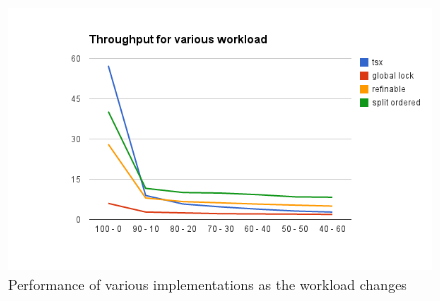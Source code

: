 \begin{figure}
 \centering
  \includegraphics[scale=0.5]{hashes_tsx_perf.png}
\caption{Performance of various implementations as the workload changes}
\label{hashes_tsx_perf}
\end{figure}

